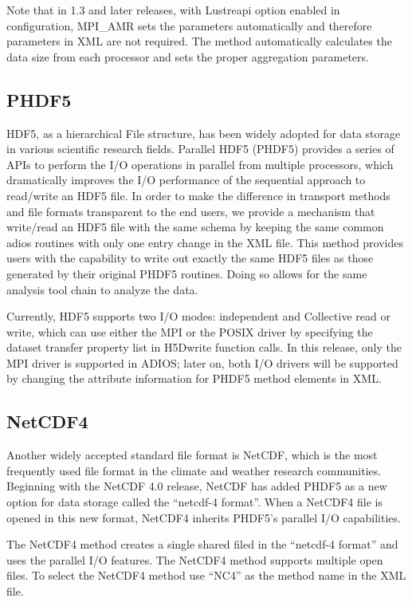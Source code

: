 Note that in 1.3 and later releases, with Lustreapi option enabled in configuration, 
MPI\_AMR sets the parameters automatically and therefore parameters in XML are 
not required. The method automatically calculates the data size from each processor 
and sets the proper aggregation parameters.

\subsection{PHDF5}

HDF5, as a hierarchical File structure, has been widely adopted for data storage 
in various scientific research fields.  Parallel HDF5 (PHDF5) provides a series 
of APIs to perform the I/O operations in parallel from multiple processors, which 
dramatically improves the I/O performance of the sequential approach to read/write 
an HDF5 file. In order to make the difference in transport methods and file formats 
transparent to the end users, we provide a mechanism that write/read an HDF5 file 
with the same schema by keeping the same common adios routines with only one entry 
change in the XML file. This method provides users with the capability to write 
out exactly the same HDF5 files as those generated by their original PHDF5 routines. 
Doing so allows for the same analysis tool chain to analyze the data. 

Currently, HDF5 supports two I/O modes: independent and Collective read or write, 
which can use either the MPI or the POSIX driver by specifying the dataset transfer 
property list in H5Dwrite function calls. In this release, only the MPI driver 
is supported in ADIOS; later on, both I/O drivers will be supported by changing 
the attribute information for PHDF5 method elements in XML. 

\subsection{NetCDF4}

Another widely accepted standard file format is NetCDF, which is the most frequently 
used file format in the climate and weather research communities.  Beginning with 
the NetCDF 4.0 release, NetCDF has added PHDF5 as a new option for data storage 
called the ``netcdf-4 format''.  When a NetCDF4 file is opened in this new format, 
NetCDF4 inherits PHDF5's parallel I/O capabilities.

The NetCDF4 method creates a single shared filed in the ``netcdf-4 format'' and 
uses the parallel I/O features.  The NetCDF4 method supports multiple open files. 
 To select the NetCDF4 method use ``NC4'' as the method name in the XML file.

